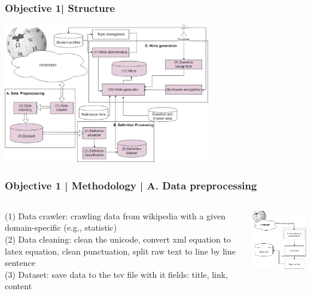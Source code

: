 \documentclass{beamer}
\begin{document}
\begin{frame}
\frametitle{Objective 1| Structure}





\begin{center}
			\includegraphics[width=90mm]{ggg.png}
\end{center}

\end{frame}
\begin{frame}

\frametitle{Objective 1 | Methodology | A. Data preprocessing}
\begin{columns}
\begin{column}{.5\textwidth}

(1) Data crawler: crawling data from wikipedia with a given domain-specific (e.g., statistic)\\

(2) Data cleaning: clean the unicode, convert xml equation to latex equation, clean punctuation, split raw text to line by line sentence\\
(3) Dataset: save data to the tsv file with it fields: title, link, content\\
\end{column}
\begin{column}{.5\textwidth}
		\includegraphics[width=50mm]{cr1.png}
\end{column}

\end{columns}
\end{frame}
\end{document}
